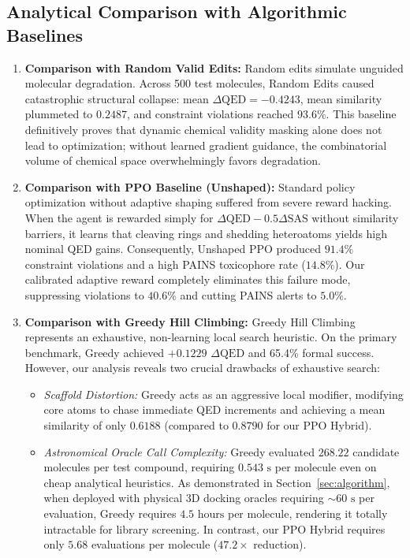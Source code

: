 \documentclass{ieeeaccess}
\begin{document}
\subsection{Analytical Comparison with Algorithmic Baselines}
\begin{enumerate}
    \item \textbf{Comparison with Random Valid Edits:} Random edits simulate unguided molecular degradation. Across 500 test molecules, Random Edits caused catastrophic structural collapse: mean $\Delta\text{QED} = -0.4243$, mean similarity plummeted to $0.2487$, and constraint violations reached $93.6\%$. This baseline definitively proves that dynamic chemical validity masking alone does not lead to optimization; without learned gradient guidance, the combinatorial volume of chemical space overwhelmingly favors degradation.
    \item \textbf{Comparison with PPO Baseline (Unshaped):} Standard policy optimization without adaptive shaping suffered from severe reward hacking. When the agent is rewarded simply for $\Delta\text{QED} - 0.5\Delta\text{SAS}$ without similarity barriers, it learns that cleaving rings and shedding heteroatoms yields high nominal QED gains. Consequently, Unshaped PPO produced $91.4\%$ constraint violations and a high PAINS toxicophore rate ($14.8\%$). Our calibrated adaptive reward completely eliminates this failure mode, suppressing violations to $40.6\%$ and cutting PAINS alerts to $5.0\%$.
    \item \textbf{Comparison with Greedy Hill Climbing:} Greedy Hill Climbing represents an exhaustive, non-learning local search heuristic. On the primary benchmark, Greedy achieved $+0.1229$ $\Delta\text{QED}$ and 65.4\% formal success. However, our analysis reveals two crucial drawbacks of exhaustive search:
    \begin{itemize}
        \item \emph{Scaffold Distortion:} Greedy acts as an aggressive local modifier, modifying core atoms to chase immediate QED increments and achieving a mean similarity of only $0.6188$ (compared to $\mathbf{0.8790}$ for our PPO Hybrid).
        \item \emph{Astronomical Oracle Call Complexity:} Greedy evaluated $268.22$ candidate molecules per test compound, requiring $0.543\text{ s}$ per molecule even on cheap analytical heuristics. As demonstrated in Section~\ref{sec:algorithm}, when deployed with physical 3D docking oracles requiring $\sim 60\text{ s}$ per evaluation, Greedy requires $4.5\text{ hours}$ per molecule, rendering it totally intractable for library screening. In contrast, our PPO Hybrid requires only $\mathbf{5.68}$ evaluations per molecule ($47.2\times$ reduction).
    \end{itemize}
\end{enumerate}
\end{document}
